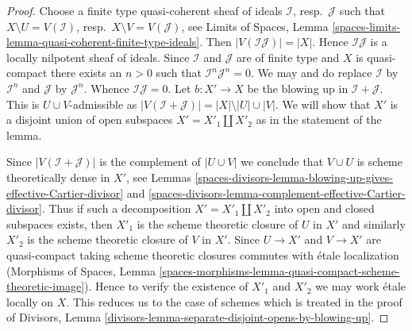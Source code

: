 \begin{proof}
Choose a finite type quasi-coherent sheaf of ideals $\mathcal{I}$,
resp.\ $\mathcal{J}$ such that $X \setminus U = V(\mathcal{I})$,
resp.\ $X \setminus V = V(\mathcal{J})$, see
Limits of Spaces, Lemma
\ref{spaces-limits-lemma-quasi-coherent-finite-type-ideals}.
Then $|V(\mathcal{I}\mathcal{J})| = |X|$. Hence
$\mathcal{I}\mathcal{J}$ is a locally nilpotent sheaf of ideals.
Since $\mathcal{I}$ and $\mathcal{J}$ are of finite type and $X$
is quasi-compact there exists an $n > 0$ such that
$\mathcal{I}^n \mathcal{J}^n = 0$. We may and do replace $\mathcal{I}$
by $\mathcal{I}^n$ and $\mathcal{J}$ by $\mathcal{J}^n$. Whence
$\mathcal{I} \mathcal{J} = 0$. Let $b : X' \to X$ be the blowing
up in $\mathcal{I} + \mathcal{J}$. This is $U \cup V$-admissible
as $|V(\mathcal{I} + \mathcal{J})| = |X| \setminus |U| \cup |V|$.
We will show that $X'$ is a disjoint union of open subspaces
$X' = X'_1 \amalg X'_2$ as in the statement of the lemma.

\medskip\noindent
Since $|V(\mathcal{I} + \mathcal{J})|$ is the complement of
$|U \cup V|$ we conclude that $V \cup U$ is scheme theoretically
dense in $X'$, see
Lemmas \ref{spaces-divisors-lemma-blowing-up-gives-effective-Cartier-divisor} and
\ref{spaces-divisors-lemma-complement-effective-Cartier-divisor}.
Thus if such a decomposition $X' = X'_1 \amalg X'_2$
into open and closed subspaces exists, then $X'_1$ is the
scheme theoretic closure of $U$ in $X'$ and similarly $X'_2$ is
the scheme theoretic closure of $V$ in $X'$. Since $U \to X'$
and $V \to X'$ are quasi-compact taking scheme theoretic
closures commutes with \'etale localization (Morphisms of Spaces,
Lemma \ref{spaces-morphisms-lemma-quasi-compact-scheme-theoretic-image}).
Hence to verify the existence of $X'_1$ and $X'_2$ we may work \'etale
locally on $X$. This reduces us to the case of schemes which is
treated in the proof of Divisors, Lemma
\ref{divisors-lemma-separate-disjoint-opens-by-blowing-up}.
\end{proof}



